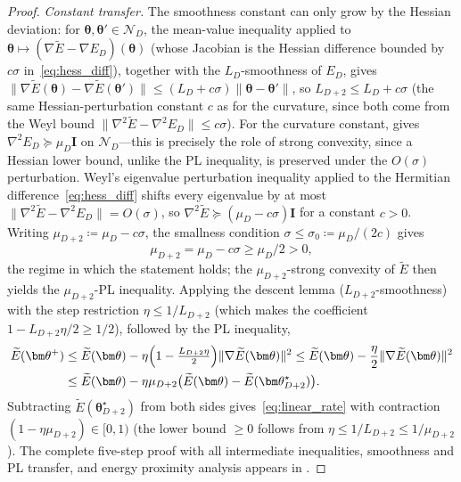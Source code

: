\documentclass[11pt]{article}
\newcommand{\cN}{\mathcal{N}}
\theoremstyle{plain}
\theoremstyle{plain}
\begin{document}
\begin{proof}
\emph{Constant transfer.}  The smoothness constant can only grow by the
Hessian deviation: for $\bm\theta,\bm\theta'\in\cN_D$, the mean-value
inequality applied to $\bm\theta\mapsto(\nabla\widetilde{E}-\nabla E_D)(\bm\theta)$
(whose Jacobian is the Hessian difference bounded by $c\sigma$
in~\eqref{eq:hess_diff}), together with the $L_D$-smoothness of $E_D$, gives
$\|\nabla\widetilde{E}(\bm\theta)-\nabla\widetilde{E}(\bm\theta')\|
\le(L_D+c\sigma)\|\bm\theta-\bm\theta'\|$, so $L_{D+2}\le L_D+c\sigma$
(the same Hessian-perturbation constant $c$ as for the curvature, since
both come from the Weyl bound $\|\nabla^2\widetilde{E}-\nabla^2 E_D\|\le c\sigma$).
For the curvature constant,  gives
$\nabla^2 E_D\succeq\mu_D\mathbf{I}$ on $\cN_D$---this is precisely the role
of strong convexity, since a Hessian lower bound, unlike the PL
inequality, is preserved under the $O(\sigma)$ perturbation.  Weyl's
eigenvalue perturbation inequality applied to the Hermitian
difference~\eqref{eq:hess_diff} shifts every eigenvalue by at most
$\|\nabla^2\widetilde{E}-\nabla^2 E_D\|=O(\sigma)$, so
$\nabla^2\widetilde{E}\succeq(\mu_D-c\sigma)\mathbf{I}$ for a constant
$c>0$.  Writing $\mu_{D+2}\coloneqq\mu_D-c\sigma$, the smallness
condition $\sigma\le\sigma_0\coloneqq\mu_D/(2c)$ gives
\begin{equation}\label{eq:sigma_threshold_main}
  \mu_{D+2}=\mu_D-c\sigma\ge\mu_D/2>0,
\end{equation}
the regime in which the statement holds; the $\mu_{D+2}$-strong convexity
of $\widetilde{E}$ then yields the $\mu_{D+2}$-PL inequality.
Applying the descent lemma ($L_{D+2}$-smoothness) with the step
restriction $\eta\le 1/L_{D+2}$ (which makes the coefficient
$1-L_{D+2}\eta/2\ge 1/2$), followed by the PL inequality,
\begin{align}
  \widetilde{E}(\bm\theta^+)
  &\le \widetilde{E}(\bm\theta)
  -\eta\Bigl(1-\tfrac{L_{D+2}\eta}{2}\Bigr)
   \|\nabla \widetilde{E}(\bm\theta)\|^2
  \le \widetilde{E}(\bm\theta)
  -\frac{\eta}{2}\|\nabla \widetilde{E}(\bm\theta)\|^2 \notag\\
  &\le \widetilde{E}(\bm\theta)
   -\eta\mu_{D+2}\bigl(\widetilde{E}(\bm\theta)
   -\widetilde{E}(\bm\theta_{D+2}^\star)\bigr).
\end{align}
Subtracting $\widetilde{E}(\bm\theta_{D+2}^\star)$ from both sides
gives~\eqref{eq:linear_rate} with contraction
$(1-\eta\mu_{D+2})\in[0,1)$ (the lower bound $\ge 0$ follows from
$\eta\le 1/L_{D+2}\le 1/\mu_{D+2}$).
The complete five-step proof with all intermediate inequalities,
smoothness and PL transfer, and energy proximity analysis appears in
.
\end{proof}
\end{document}
